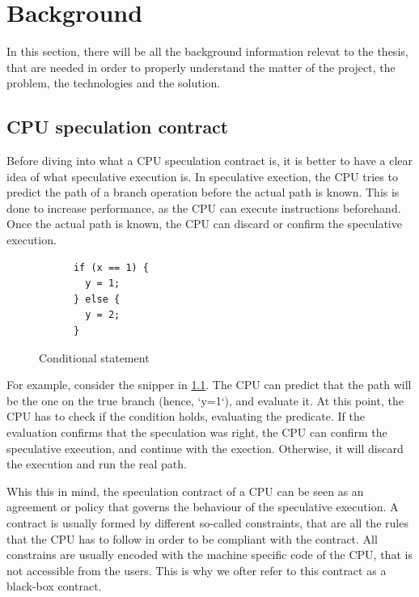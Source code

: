 \chapter{Background}
\label{cha:background}

In this section, there will be all the background information relevat to the thesis,
that are needed in order to properly understand the matter of the project, the problem,
the technologies and the solution.

\section{CPU speculation contract}
\label{cha:CPU speculation contract} Before diving into what a CPU speculation
contract is, it is better to have a clear idea of what speculative execution is.
In speculative exection, the CPU tries to predict the path of a branch operation
before the actual path is known. This is done to increase performance, as the CPU
can execute instructions beforehand. Once the actual path is known, the CPU can discard
or confirm the speculative execution.

\begin{figure}
  \centering
  \begin{varwidth}
    {\linewidth} \begin{verbatim}
      if (x == 1) {
        y = 1;
      } else {
        y = 2;
      }
          \end{verbatim}
  \end{varwidth}
  \label{fig:snip1}
  \caption{Conditional statement}
\end{figure}

For example, consider the snipper in \ref{fig:snip1}. The CPU can predict that
the path will be the one on the true branch (hence, `y=1`), and evaluate it. At this
point, the CPU has to check if the condition holds, evaluating the predicate. If
the evaluation confirms that the speculation was right, the CPU can confirm the speculative
execution, and continue with the exection. Otherwise, it will discard the
execution and run the real path.

Whis this in mind, the speculation contract of a CPU can be seen as an agreement
or policy that governs the behaviour of the speculative execution. A contract is
usually formed by different so-called constraints, that are all the rules that the
CPU has to follow in order to be compliant with the contract. All constrains are
usually encoded with the machine specific code of the CPU, that is not accessible
from the users. This is why we ofter refer to this contract as a black-box
contract.

